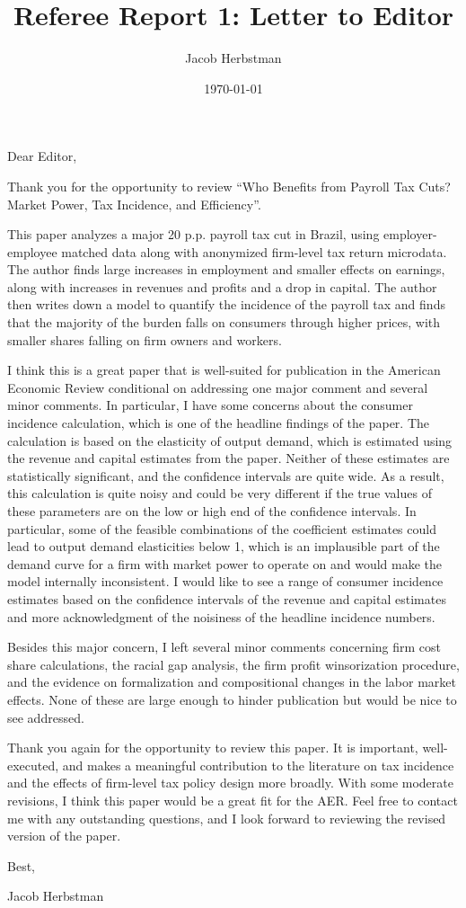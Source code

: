 \documentclass{article}
\title{Referee Report 1: Letter to Editor}
\author{Jacob Herbstman}
\date{\today}
\begin{document}
\maketitle

Dear Editor, 

\vspace{0.5cm}

Thank you for the opportunity to review ``Who Benefits from Payroll Tax Cuts? Market Power, Tax Incidence, and Efficiency''.

This paper analyzes a major 20 p.p. payroll tax cut in Brazil, using employer-employee matched data along with anonymized firm-level tax return microdata. 
The author finds large increases in employment and smaller effects on earnings, along with increases in revenues and profits and a drop in capital. 
The author then writes down a model to quantify the incidence of the payroll tax and finds that the majority of the burden falls on consumers through higher prices, with smaller shares falling on firm owners and workers.

I think this is a great paper that is well-suited for publication in the American Economic Review conditional on addressing one major comment and several minor comments.
In particular, I have some concerns about the consumer incidence calculation, which is one of the headline findings of the paper. 
The calculation is based on the elasticity of output demand, which is estimated using the revenue and capital estimates from the paper.
Neither of these estimates are statistically significant, and the confidence intervals are quite wide. 
As a result, this calculation is quite noisy and could be very different if the true values of these parameters are on the low or high end of the confidence intervals.
In particular, some of the feasible combinations of the coefficient estimates could lead to output demand elasticities below 1, 
which is an implausible part of the demand curve for a firm with market power to operate on and would make the model internally inconsistent.
I would like to see a range of consumer incidence estimates based on the confidence intervals of the revenue and capital estimates and more acknowledgment of the noisiness of the headline incidence numbers. 

Besides this major concern, I left several minor comments concerning firm cost share calculations, the racial gap analysis, the firm profit winsorization procedure, 
and the evidence on formalization and compositional changes in the labor market effects. None of these are large enough to hinder publication but would be nice to see addressed. 

Thank you again for the opportunity to review this paper. It is important, well-executed, and makes a meaningful contribution to the literature on tax incidence and the effects of firm-level tax policy design more broadly. 
With some moderate revisions, I think this paper would be a great fit for the AER. Feel free to contact me with any outstanding questions, 
and I look forward to reviewing the revised version of the paper.

\vspace{0.5cm}
Best, 

Jacob Herbstman
\end{document}
